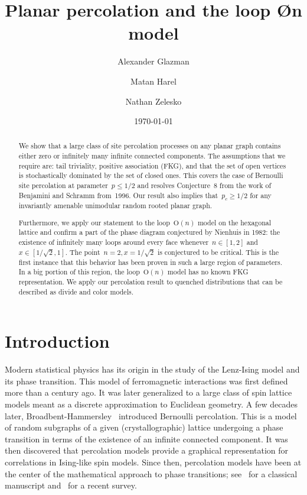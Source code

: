 \documentclass[11pt,letterpaper]{amsart}
\author{Alexander Glazman}
\author{Matan Harel}
\author{Nathan Zelesko}
\title[Planar percolation and the loop \O{n} model]{Planar percolation and the loop \O{n} model}
\date{\today}
\newcounter{n}
\numberwithin{n}{section}
\theoremstyle{plain}
\theoremstyle{definition}
\theoremstyle{remark}
\renewcommand\O[1]{\(\mathrm{O}(#1)\)}
\newcommand{\1}{\mathbbm{1}}
\begin{document}
\begin{abstract}
	We show that a large class of site percolation processes on any planar graph contains either zero or infinitely many infinite connected components. The assumptions that we require are: tail triviality, positive association (FKG), and that the set of open vertices is stochastically dominated by the set of closed ones.
	This covers the case of Bernoulli site percolation at parameter~$p\leq 1/2$ and resolves Conjecture~$8$ from the work of Benjamini and Schramm from~1996.
	Our result also implies that~$p_c\geq 1/2$ for any invariantly amenable unimodular random rooted planar graph.
	
	Furthermore, we apply our statement to the loop~\O{n} model on the hexagonal lattice and confirm a part of the phase diagram conjectured by Nienhuis in 1982: the existence of infinitely many loops around every face whenever~$n\in [1,2]$ and~$x\in [1/\sqrt{2},1]$.
	The point~$n=2,x=1/\sqrt{2}$ is conjectured to be critical.
	This is the first instance that this behavior has been proven in such a large region of parameters.
	In a big portion of this region, the loop~\O{n} model has no known FKG representation. We apply our percolation result to quenched distributions that can be described as divide and color models.
\end{abstract}

\maketitle

\section{Introduction}
\label{sec:intro}


Modern statistical physics has its origin in the study of the Lenz-Ising model and its phase transition. This model of ferromagnetic interactions was first defined more than a century ago. It was later generalized to a large class of spin lattice models meant as a discrete approximation to Euclidean geometry. A few decades later, Broadbent-Hammersley~\cite{BroHam57} introduced Bernoulli percolation. 
This is a model of random subgraphs of a given (crystallographic) lattice undergoing a phase transition in terms of the existence of an infinite connected component.
It was then discovered that percolation models provide a graphical representation for correlations in Ising-like spin models.
Since then, percolation models have been at the center of the mathematical approach to phase transitions; see~\cite{Gri99a} for a classical manuscript and~\cite{Man25} for a recent survey.
\end{document}
